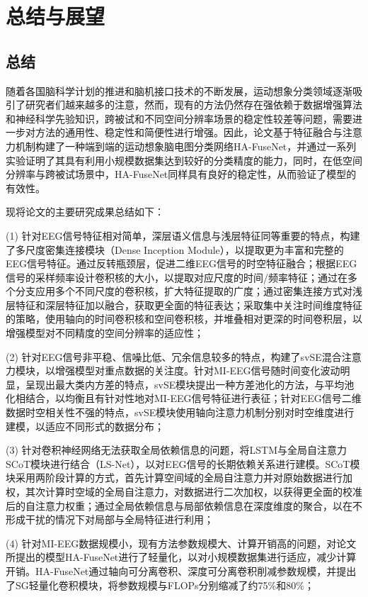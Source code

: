 
\chapter{总结与展望}

\section{总结}

随着各国脑科学计划的推进和脑机接口技术的不断发展，运动想象分类领域逐渐吸引了研究者们越来越多的注意，然而，现有的方法仍然存在强依赖于数据增强算法和神经科学先验知识，跨被试和不同空间分辨率场景的稳定性较差等问题，需要进一步对方法的通用性、稳定性和简便性进行增强。因此，论文基于特征融合与注意力机制构建了一种端到端的运动想象脑电图分类网络HA-FuseNet，并通过一系列实验证明了其具有利用小规模数据集达到较好的分类精度的能力，同时，在低空间分辨率与跨被试场景中，HA-FuseNet同样具有良好的稳定性，从而验证了模型的有效性。

现将论文的主要研究成果总结如下：

(1) 针对EEG信号特征相对简单，深层语义信息与浅层特征同等重要的特点，构建了多尺度密集连接模块（Dense Inception Module），以提取更为丰富和完整的EEG信号特征。通过反转瓶颈层，促进二维EEG信号的时空特征融合；根据EEG信号的采样频率设计卷积核的大小，以提取对应尺度的时间/频率特征；通过在多个分支应用多个不同尺度的卷积核，扩大特征提取的广度；通过密集连接方式对浅层特征和深层特征加以融合，获取更全面的特征表达；采取集中关注时间维度特征的策略，使用轴向的时间卷积核和空间卷积核，并堆叠相对更深的时间卷积层，以增强模型对不同精度的空间分辨率的适应性；

(2) 针对EEG信号非平稳、信噪比低、冗余信息较多的特点，构建了svSE混合注意力模块，以增强模型对重点数据的关注度。针对MI-EEG信号随时间变化波动明显，呈现出最大类内方差的特点\cite{mane2021fbcnet}，svSE模块提出一种方差池化的方法，与平均池化相结合，以均衡且有针对性地对MI-EEG信号特征进行表征；针对EEG信号二维数据时空相关性不强的特点，svSE模块使用轴向注意力机制分别对时空维度进行建模，以适应不同形式的数据分布；

(3) 针对卷积神经网络无法获取全局依赖信息的问题，将LSTM与全局自注意力SCoT模块进行结合（LS-Net），以对EEG信号的长期依赖关系进行建模。SCoT模块采用两阶段计算的方式，首先计算空间域的全局自注意力并对原始数据进行加权，其次计算时空域的全局自注意力，对数据进行二次加权，以获得更全面的校准后的自注意力权重；通过全局依赖信息与局部依赖信息在深度维度的聚合，以在不形成干扰的情况下对局部与全局特征进行利用；

(4) 针对MI-EEG数据规模小，现有方法参数规模大、计算开销高的问题，对论文所提出的模型HA-FuseNet进行了轻量化，以对小规模数据集进行适应，减少计算开销。HA-FuseNet通过轴向可分离卷积、深度可分离卷积削减参数规模，并提出了SG轻量化卷积模块，将参数规模与FLOPs分别缩减了约75\%和80\%；

